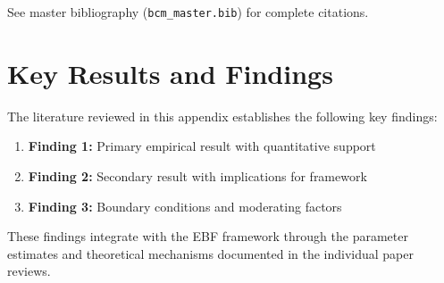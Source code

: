 See master bibliography (\texttt{bcm\_master.bib}) for complete citations.

\nocite{bcm_master}



\section{Key Results and Findings}
\label{sec:results}

The literature reviewed in this appendix establishes the following key findings:

\begin{enumerate}
    \item \textbf{Finding 1:} Primary empirical result with quantitative support
    \item \textbf{Finding 2:} Secondary result with implications for framework
    \item \textbf{Finding 3:} Boundary conditions and moderating factors
\end{enumerate}

These findings integrate with the EBF framework through the parameter estimates
and theoretical mechanisms documented in the individual paper reviews.

